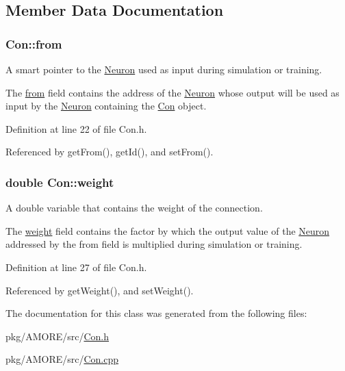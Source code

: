 \subsection{Member Data Documentation}
\hypertarget{class_con_a7c05f90dff56fd26c1fa0f042bba67a6}{
\subsubsection[{from}]{ {\bf Con::from}}}
\label{class_con_a7c05f90dff56fd26c1fa0f042bba67a6}


A smart pointer to the \hyperlink{class_neuron}{Neuron} used as input during simulation or training. 

The \hyperlink{class_con_a7c05f90dff56fd26c1fa0f042bba67a6}{from} field contains the address of the \hyperlink{class_neuron}{Neuron} whose output will be used as input by the \hyperlink{class_neuron}{Neuron} containing the \hyperlink{class_con}{Con} object. 

Definition at line 22 of file Con.h.



Referenced by getFrom(), getId(), and setFrom().

\hypertarget{class_con_a7f46485ba5b41971ea38641f9e7d1be0}{
\subsubsection[{weight}]{\setlength{\rightskip}{0pt plus 5cm}double {\bf Con::weight}}}
\label{class_con_a7f46485ba5b41971ea38641f9e7d1be0}


A double variable that contains the weight of the connection. 

The \hyperlink{class_con_a7f46485ba5b41971ea38641f9e7d1be0}{weight} field contains the factor by which the output value of the \hyperlink{class_neuron}{Neuron} addressed by the from field is multiplied during simulation or training. 

Definition at line 27 of file Con.h.



Referenced by getWeight(), and setWeight().



The documentation for this class was generated from the following files:\begin{DoxyCompactItemize}
\item 
pkg/AMORE/src/\hyperlink{_con_8h}{Con.h}\item 
pkg/AMORE/src/\hyperlink{_con_8cpp}{Con.cpp}\end{DoxyCompactItemize}
